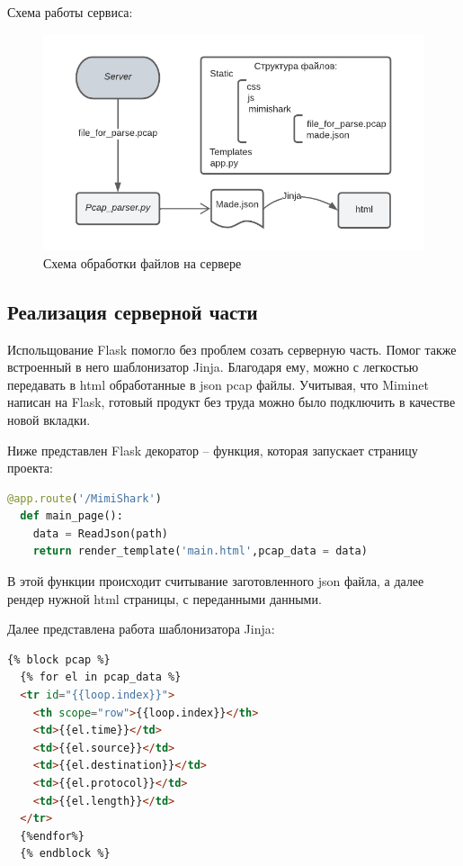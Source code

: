 Схема работы сервиса:
\begin{figure}[!ht]
  \begin{center}
  \includegraphics[scale=1.3]{Scheme_of_project.png}\caption{Схема обработки файлов на сервере}\label{figure2}
  \end{center}
\end{figure}


\subsection{Реализация серверной части} 
Испольщование Flask помогло без проблем созать серверную часть. Помог также встроенный в него шаблонизатор Jinja.
Благодаря ему, можно с легкостью передавать в html обработанные в json pcap файлы.
Учитывая, что Miminet написан на Flask, готовый продукт без труда можно было подключить в качестве новой вкладки.

Ниже представлен Flask декоратор -- функция, которая запускает страницу проекта:
\begin{lstlisting}[caption=\textbf{Основной декоратор}, language=Python, frame=single]
  @app.route('/MimiShark')
  def main_page():
    data = ReadJson(path)
    return render_template('main.html',pcap_data = data)
\end{lstlisting}

В этой функции происходит считывание заготовленного json файла, а далее рендер нужной html страницы, с переданными данными.

Далее представлена работа шаблонизатора Jinja:
\begin{lstlisting}[caption=\textbf{Передача pcap файлов в html}, language=HTML, frame=single]
  {% block pcap %}
  {% for el in pcap_data %}
  <tr id="{{loop.index}}">
    <th scope="row">{{loop.index}}</th>
    <td>{{el.time}}</td>
    <td>{{el.source}}</td>
    <td>{{el.destination}}</td>
    <td>{{el.protocol}}</td>
    <td>{{el.length}}</td>
  </tr>
  {%endfor%}
  {% endblock %}
\end{lstlisting}

